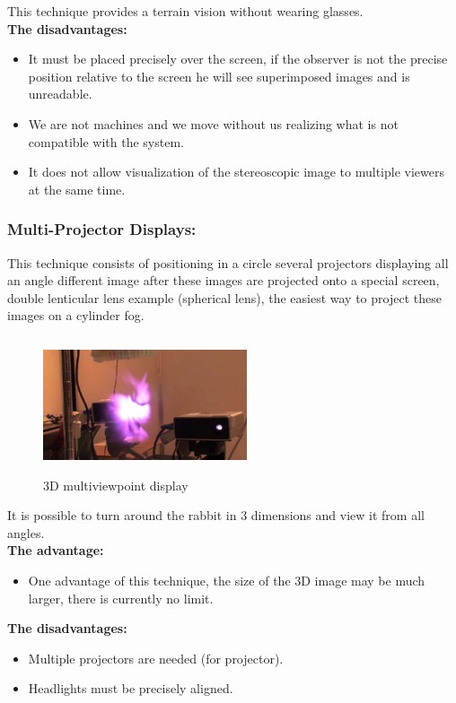 This technique provides a terrain vision without wearing glasses.\\

\textbf{The disadvantages:}
\begin{itemize}
\item It must be placed precisely over the screen, if the observer is not the precise position relative to the screen he will see superimposed images and is unreadable.
\item We are not machines and we move without us realizing what is not compatible with the system.
\item It does not allow visualization of the stereoscopic image to multiple viewers at the same time.
\end{itemize}

\subsubsection{Multi-Projector Displays:}

This technique consists of positioning in a circle several projectors displaying all an angle different image after these images are projected onto a special screen, double lenticular lens example (spherical lens), the easiest way to project these images on a cylinder fog.

\begin{figure}[h!]
\begin{center}
\begin{minipage}{1\linewidth}
\centering\includegraphics[width=6cm,height=4cm]{image/lapin.png}
\caption{3D multiviewpoint display\cite{3Dmultiviewpoint}}
\end{minipage}
\end{center}
\end{figure}

It is possible to turn around the rabbit in 3 dimensions and view it from all angles.\\
\textbf{The advantage:} 

\begin{itemize}
\item One advantage of this technique, the size of the 3D image may be much larger, there is currently no limit.
\end{itemize}
\textbf{The disadvantages:}
\begin{itemize}
\item  Multiple projectors are needed (for projector).
\item Headlights must be precisely aligned.
\end{itemize}


